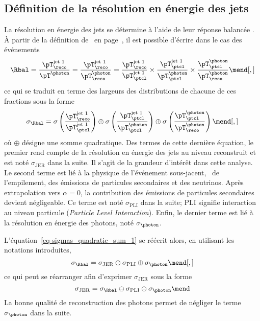 \subsection{Définition de la résolution en énergie des jets}\label{chapter-JERC-section-JER-subsec-JER_definition}
La résolution en énergie des jets se détermine à l'aide de leur réponse balancée \Rbal.
À partir de la définition de \Rbal\ en page~\pageref{eq-chapter-JERC-section-CMS-subsec-residuals-Rbal_def}, il est possible d'écrire dans le cas des événements \Gjets
\begin{equation}
\Rbal
= \frac{\pT_\reco^\text{jet 1}}{\pT^{\photon}}
= \frac{\pT_\reco^\text{jet 1}}{\pT^{\photon}_\reco}
=
\frac{\pT_\reco^\text{jet 1}}{\pT^\text{jet 1}_\ptcl}
\times
\frac{\pT^\text{jet 1}_\ptcl}{\pT^{\photon}_\ptcl}
\times
\frac{\pT^{\photon}_\ptcl}{\pT^{\photon}_\reco}
\mend[,]
\end{equation}
ce qui se traduit en terme des largeurs des distributions de chacune de ces fractions sous la forme
\begin{equation}
\sigma_{\Rbal}
=
\sigma\left(\frac{\pT_\reco^\text{jet 1}}{\pT^\text{jet 1}_\ptcl}\right)
\oplus
\sigma\left(\frac{\pT^\text{jet 1}_\ptcl}{\pT^{\photon}_\ptcl}\right)
\oplus
\sigma\left(\frac{\pT^{\photon}_\ptcl}{\pT^{\photon}_\reco} \vphantom{\frac{\pT^\text{jet 1}_\ptcl}{\pT^{\photon}_\ptcl}}\right)
\label{eq-sigmas_quadratic_sum_1}
\mend[,]
\end{equation}
où $\oplus$ désigne une somme quadratique.
Des termes de cette dernière équation, le premier rend compte de la résolution en énergie des jets au niveau reconstruit et est noté $\sigma_\text{JER}$ dans la suite.
Il s'agit de la grandeur d'intérêt dans cette analyse.
Le second terme est lié à la physique de l'événement sous-jacent, \ie\ de l'empilement, des émissions de particules secondaires et des neutrinos.
Après extrapolation vers $\alpha=0$, la contribution des émissions de particules secondaires devient négligeable.
Ce terme est noté $\sigma_\text{PLI}$ dans la suite; \og PLI \fg{} signifie interaction au niveau particule (\emph{Particle Level Interaction}).
Enfin, le dernier terme est lié à la résolution en énergie des photons, noté $\sigma_{\photon}$.
\par L'équation~\eqref{eq-sigmas_quadratic_sum_1} se réécrit alors, en utilisant les notations introduites,
\begin{equation}
\sigma_{\Rbal}
=
\sigma_\text{JER}
\oplus
\sigma_\text{PLI}
\oplus
\sigma_{\photon}
\label{eq-sigmas_quadratic_sum_2}
\mend[,]
\end{equation}
ce qui peut se réarranger afin d'exprimer $\sigma_\text{JER}$ sous la forme
\begin{equation}
\sigma_\text{JER}
=
\sigma_{\Rbal}
\ominus
\sigma_\text{PLI}
\ominus
\sigma_{\photon}
\label{eq-sigmas_quadratic_sum_3}
\mend
\end{equation}
La bonne qualité de reconstruction des photons permet de négliger le terme $\sigma_{\photon}$ dans la suite.

